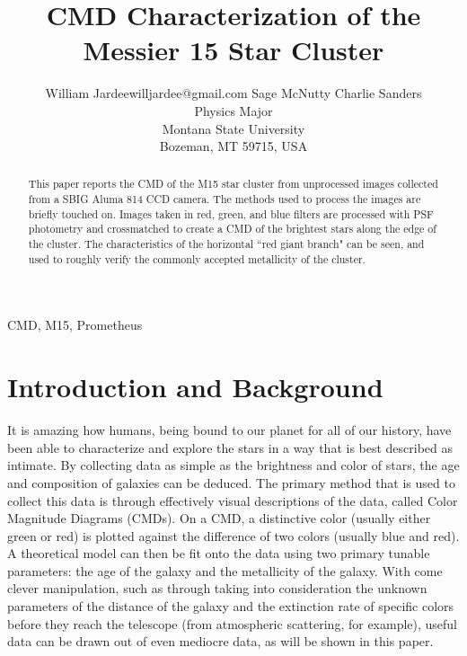 \documentclass[twoside,11pt]{article}
\begin{document}
\title{CMD Characterization of the Messier 15 Star Cluster}

       
\author{\name William Jardee\email willjardee@gmail.com \AND
       	\name Sage McNutty \email  \AND 
        \name Charlie Sanders \email  \\
       	\addr Physics Major\\
       	Montana State University\\
       	Bozeman, MT 59715, USA
      	}

\maketitle

\begin{abstract}%
This paper reports the CMD of the M15 star cluster from unprocessed images collected from a SBIG Aluma 814 CCD camera. The methods used to process the images are briefly touched on. Images taken in red, green, and blue filters are processed with PSF photometry and crossmatched to create a CMD of the brightest stars along the edge of the cluster. The characteristics of the horizontal ``red giant branch" can be seen, and used to roughly verify the commonly accepted metallicity of the cluster. 
\end{abstract}

\begin{keywords}
CMD, M15, Prometheus
\end{keywords}

\section{Introduction and Background}
It is amazing how humans, being bound to our planet for all of our history, have been able to characterize and explore the stars in a way that is best described as intimate. By collecting data as simple as the brightness and color of stars, the age and composition of galaxies can be deduced. The primary method that is used to collect this data is through effectively visual descriptions of the data, called Color Magnitude Diagrams (CMDs). On a CMD, a distinctive color (usually either green or red) is plotted against the difference of two colors (usually blue and red). A theoretical model can then be fit onto the data using two primary tunable parameters: the age of the galaxy and the metallicity of the galaxy. With come clever manipulation, such as through taking into consideration the unknown parameters of the distance of the galaxy and the extinction rate of specific colors before they reach the telescope (from atmospheric scattering, for example), useful data can be drawn out of even mediocre data, as will be shown in this paper. 
\end{document}
